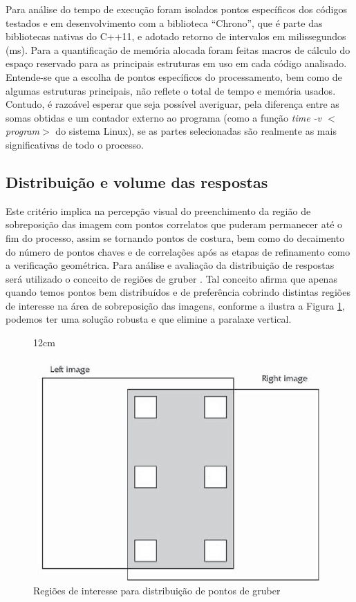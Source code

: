 Para análise do tempo de execução foram isolados pontos específicos dos códigos testados e em desenvolvimento com a biblioteca ``Chrono'', que é parte das bibliotecas nativas do C++11, e adotado retorno de intervalos em milissegundos (ms). Para a quantificação de memória alocada foram feitas macros de cálculo do espaço reservado para as principais estruturas em uso em cada código analisado. Entende-se que a escolha de pontos específicos do processamento, bem como de algumas estruturas principais, não reflete o total de tempo e memória usados. Contudo, é razoável esperar que seja possível averiguar, pela diferença entre as somas obtidas e um contador externo ao programa (como a função \textit{time -v $<$program$>$} do sistema Linux), se as partes selecionadas são realmente as mais significativas de todo o processo.


\subsection{Distribuição e volume das respostas} \label{Dist_gruber}

Este critério implica na percepção visual do preenchimento da região de sobreposição das imagem com pontos correlatos que puderam permanecer até o fim do processo, assim se tornando pontos de costura, bem como do decaimento do número de pontos chaves e de correlações após as etapas de refinamento como a verificação geométrica. Para análise e avaliação da distribuição de respostas será utilizado o conceito de regiões de gruber \cite{manual_photogrammetry}. Tal conceito afirma que apenas quando temos pontos bem distribuídos e de preferência cobrindo distintas regiões de interesse na área de sobreposição das imagens, conforme a ilustra a Figura \ref{gruberarea}, podemos ter uma solução robusta e que elimine a paralaxe vertical.


\begin{figure}[!ht]{12cm}
  \caption{Regiões de interesse para distribuição de pontos de gruber} \label{gruberarea}
  \includegraphics[width=\hsize]{figuras/gruberarea.png}
\end{figure}

